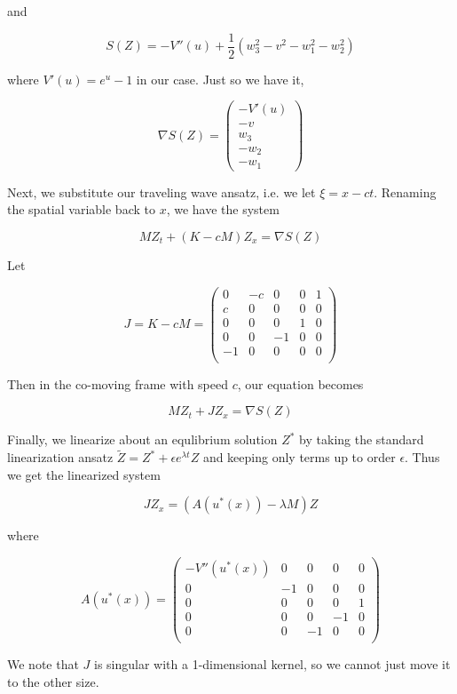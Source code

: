 \documentclass[12pt]{article}
\begin{document}
and

\[
S(Z) = -V''(u) + \frac{1}{2}(w_3^2 - v^2 - w_1^2 - w_2^2)
\]

where $V'(u) = e^u - 1$ in our case. Just so we have it, 

\[
\nabla S(Z) = \begin{pmatrix}
-V'(u) \\ -v \\ w_3 \\ -w_2 \\ -w_1
\end{pmatrix}
\]

Next, we substitute our traveling wave ansatz, i.e. we let $\xi = x - ct$. Renaming the spatial variable back to $x$, we have the system

\[
M Z_t + (K - cM)Z_x = \nabla S(Z)
\]

Let

\[
J = K - cM = 
\begin{pmatrix}
0 & -c & 0 & 0 & 1 \\
c & 0 & 0 & 0 & 0 \\
0 & 0 & 0 & 1 & 0 \\
0 & 0 & -1 & 0 & 0 \\
-1 & 0 & 0 & 0 & 0 \\
\end{pmatrix}
\]

Then in the co-moving frame with speed $c$, our equation becomes

\[
M Z_t + J Z_x = \nabla S(Z)
\]

Finally, we linearize about an equlibrium solution $Z^*$ by taking the standard linearization ansatz $\tilde{Z} = Z^* + \epsilon e^{\lambda t} Z$ and keeping only terms up to order $\epsilon$. Thus we get the linearized system

\[
J Z_x = (A(u^*(x)) - \lambda M) Z
\]

where

\[
A(u^*(x)) = 
\begin{pmatrix}
-V''(u^*(x)) & 0 & 0 & 0 & 0 \\
0 & -1 & 0 & 0 & 0 \\
0 & 0 & 0 & 0 & 1 \\
0 & 0 & 0 & -1 & 0 \\
0 & 0 & -1 & 0 & 0 \\
\end{pmatrix}
\]

We note that $J$ is singular with a 1-dimensional kernel, so we cannot just move it to the other size.\\
\end{document}
